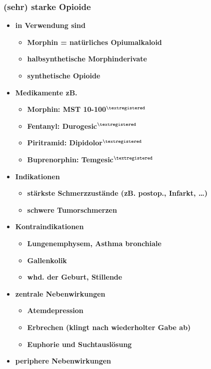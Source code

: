 \subsubsection{(sehr) starke Opioide}
	\begin{itemize}
		\item \textbf{in Verwendung sind}
			\begin{itemize}
				\item \textbf{Morphin = natürliches Opiumalkaloid}
				\item \textbf{halbsynthetische Morphinderivate}
				\item \textbf{synthetische Opioide}
			\end{itemize}
		\item \textbf{Medikamente zB.}
			\begin{itemize}
				\item \textbf{Morphin: MST 10-100$^{\textregistered}$}
				\item \textbf{Fentanyl:  Durogesic$^{\textregistered}$}
				\item \textbf{Piritramid: Dipidolor$^{\textregistered}$}
				\item \textbf{Buprenorphin: Temgesic$^{\textregistered}$}
			\end{itemize}
		\item \textbf{Indikationen}
			\begin{itemize}
				\item \textbf{stärkste Schmerzzustände (zB. postop., Infarkt, …)}
				\item \textbf{schwere Tumorschmerzen}
			\end{itemize}
		\item \textbf{Kontraindikationen}
			\begin{itemize}
				\item \textbf{Lungenemphysem, Asthma bronchiale}
				\item \textbf{Gallenkolik}
				\item \textbf{whd. der Geburt, Stillende}
			\end{itemize}
		\item \textbf{zentrale Nebenwirkungen}
			\begin{itemize}
				\item \textbf{Atemdepression}
				\item \textbf{Erbrechen (klingt nach wiederholter Gabe ab)}
				\item \textbf{Euphorie und Suchtauslösung}
			\end{itemize}
	\pagebreak
		\item \textbf{periphere Nebenwirkungen}

\end{itemize}
